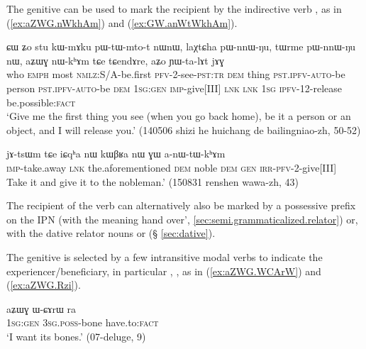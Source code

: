 The genitive can be used to mark the recipient by the indirective verb , as in (\ref{ex:aZWG.nWkhAm}) and (\ref{ex:GW.anWtWkhAm}).   

\begin{exe}
\ex \label{ex:aZWG.nWkhAm}
 \gll ɕɯ ʑo stu kɯ-mɤku pɯ-tɯ-mto-t nɯnɯ, laχtɕha pɯ-nnɯ-ŋu, tɯrme pɯ-nnɯ-ŋu nɯ, aʑɯɣ nɯ-kʰɤm tɕe tɕendɤre, aʑo ɲɯ-ta-lɤt jɤɣ \\
 who \textsc{emph} most \textsc{nmlz}:S/A-be.first \textsc{pfv}-2-see-\textsc{pst}:\textsc{tr} \textsc{dem}  thing \textsc{pst}.\textsc{ipfv}-\textsc{auto}-be   person \textsc{pst}.\textsc{ipfv}-\textsc{auto}-be \textsc{dem} \textsc{1sg}:\textsc{gen} \textsc{imp}-give[III] \textsc{lnk} \textsc{lnk} \textsc{1sg} \textsc{ipfv}-1\fl{}2-release be.possible:\textsc{fact} \\
 \glt `Give me the first thing you see (when you go back home), be it a person or an object, and I will release you.' (140506 shizi he huichang de bailingniao-zh, 50-52)
\end{exe}

\begin{exe}
\ex \label{ex:GW.anWtWkhAm}
 \gll jɤ-tsɯm tɕe iɕqʰa nɯ kɯβʁa nɯ ɣɯ a-nɯ-tɯ-kʰɤm \\
 \textsc{imp}-take.away \textsc{lnk} the.aforementioned \textsc{dem} noble \textsc{dem} \textsc{gen} \textsc{irr}-\textsc{pfv}-2-give[III] \\
 \glt  Take it and give it to the nobleman.' (150831 renshen wawa-zh, 43)
\end{exe}
 
The recipient of the verb   can alternatively also be marked by a possessive prefix on the IPN  (with the meaning  hand over', \ref{sec:semi.grammaticalized.relator}) or, with the dative relator nouns  or  (§ \ref{sec:dative}).

The genitive is selected by a few intransitive modal verbs to indicate the experiencer/beneficiary, in particular  , , as in (\ref{ex:aZWG.WCArW}) and (\ref{ex:aZWG.Rzi}).

\begin{exe}
\ex \label{ex:aZWG.WCArW}
 \gll aʑɯɣ ɯ-ɕɤrɯ ra \\
 \textsc{1sg:gen} \textsc{3sg.poss}-bone have.to:\textsc{fact} \\
\glt `I want its bones.' (07-deluge, 9)
\end{exe}

